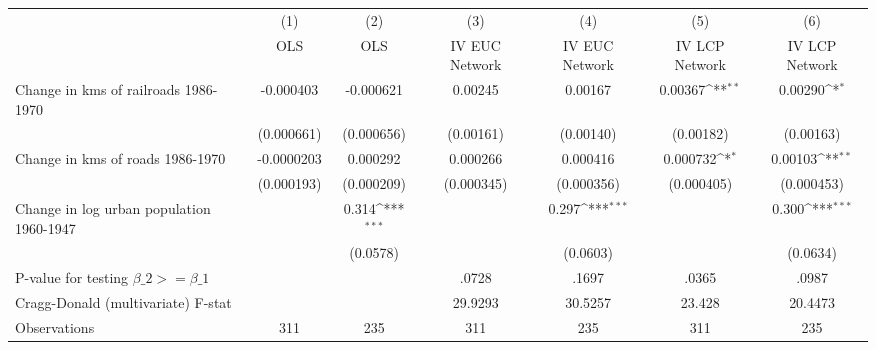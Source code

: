 {
\def\sym#1{\ifmmode^{#1}\else\(^{#1}\)\fi}
\begin{tabular}{l*{6}{c}}
\hline\hline
                &\multicolumn{1}{c}{(1)}&\multicolumn{1}{c}{(2)}&\multicolumn{1}{c}{(3)}&\multicolumn{1}{c}{(4)}&\multicolumn{1}{c}{(5)}&\multicolumn{1}{c}{(6)}\\
                &\multicolumn{1}{c}{OLS}&\multicolumn{1}{c}{OLS}&\multicolumn{1}{c}{IV EUC Network}&\multicolumn{1}{c}{IV EUC Network}&\multicolumn{1}{c}{IV LCP Network}&\multicolumn{1}{c}{IV LCP Network}\\
\hline
Change in kms of railroads 1986-1970&-0.000403         &-0.000621         &  0.00245         &  0.00167         &  0.00367\sym{**} &  0.00290\sym{*}  \\
                &(0.000661)         &(0.000656)         &(0.00161)         &(0.00140)         &(0.00182)         &(0.00163)         \\
[1em]
Change in kms of roads 1986-1970&-0.0000203         & 0.000292         & 0.000266         & 0.000416         & 0.000732\sym{*}  &  0.00103\sym{**} \\
                &(0.000193)         &(0.000209)         &(0.000345)         &(0.000356)         &(0.000405)         &(0.000453)         \\
[1em]
Change in log urban population 1960-1947&                  &    0.314\sym{***}&                  &    0.297\sym{***}&                  &    0.300\sym{***}\\
                &                  & (0.0578)         &                  & (0.0603)         &                  & (0.0634)         \\
\hline
P-value for testing $\beta\_{2} >= \beta\_{1}$&                  &                  &    .0728         &    .1697         &    .0365         &    .0987         \\
Cragg-Donald (multivariate) F-stat&                  &                  &  29.9293         &  30.5257         &   23.428         &  20.4473         \\
Observations    &      311         &      235         &      311         &      235         &      311         &      235         \\
\hline\hline
\end{tabular}
}
